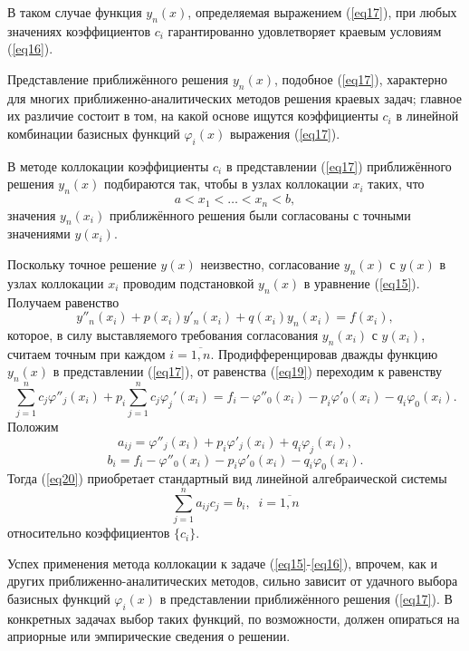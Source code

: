 \documentclass[
11pt,
master, %
subf, %
href, %
colorlinks=true, %
times, %
]{disser}
\begin{document}
В таком случае функция $y_n(x)$, определяемая выражением (\ref{eq17}), при любых значениях коэффициентов $c_i$ гарантированно удовлетворяет краевым условиям (\ref{eq16}).

Представление приближённого решения $y_n(x)$, подобное (\ref{eq17}), характерно для многих приближенно-аналитических методов решения краевых задач; главное их различие состоит в том, на какой основе ищутся коэффициенты $c_i$ в линейной комбинации базисных функций $\varphi_i(x)$ выражения (\ref{eq17}).

В методе коллокации коэффициенты $c_i$ в представлении (\ref{eq17}) приближённого решения $y_n(x)$ подбираются так, чтобы в узлах коллокации $x_i$ таких, что
$$a < x_1 < \ldots < x_n < b,$$
значения $y_n(x_i)$ приближённого решения были согласованы с точными значениями $y(x_i)$.

Поскольку точное решение $y(x)$ неизвестно, согласование $y_n(x)$ с $y(x)$ в узлах коллокации $x_i$ проводим подстановкой $y_n(x)$ в уравнение (\ref{eq15}). Получаем равенство
\begin{equation}\label{eq19}
    y''_n(x_i) + p(x_i) y'_n(x_i) + q(x_i)y_n(x_i) = f(x_i),
\end{equation}
которое, в силу выставляемого требования согласования $y_n(x_i)$ с $y(x_i)$, считаем точным при каждом $i = \overline{1,n}$. Продифференцировав дважды функцию $y_n(x)$ в представлении (\ref{eq17}), от равенства (\ref{eq19}) переходим к равенству
\begin{equation}\label{eq20}
    \sum_{j=1}^{n} c_j \varphi''_j(x_i) + p_i \sum_{j=1}^{n} c_j \varphi_j'(x_i) = f_i - \varphi''_0(x_i) - p_i \varphi'_0(x_i) - q_i \varphi_0(x_i).
\end{equation}
Положим
\begin{equation}\label{eq21}
    a_{ij} = \varphi''_j(x_i) + p_i\varphi'_j(x_i) + q_i \varphi_j(x_i),
\end{equation}
\begin{equation}\label{eq22}
    b_i = f_i - \varphi''_0(x_i) - p_i \varphi'_0(x_i) - q_i \varphi_0(x_i).
\end{equation}
Тогда (\ref{eq20}) приобретает стандартный вид линейной алгебраической системы
\begin{equation}\label{eq23}
    \sum_{j=1}^{n} a_{ij}c_j = b_i, \;\; i = \overline{1, n}
\end{equation}
относительно коэффициентов $\{c_i\}$.

Успех применения метода коллокации к задаче (\ref{eq15}-\ref{eq16}), впрочем, как и других приближенно-аналитических методов, сильно зависит от удачного выбора базисных функций $\varphi_i(x)$ в представлении приближённого решения (\ref{eq17}). В конкретных задачах выбор таких функций, по возможности, должен опираться на априорные или эмпирические сведения о решении.
\end{document}
